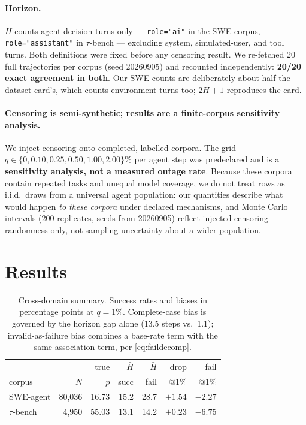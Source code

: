 \documentclass[letterpaper]{article}
\begin{document}
\paragraph{Horizon.} $H$ counts agent decision turns only --- \texttt{role="ai"}
in the SWE corpus, \texttt{role="assistant"} in $\tau$-bench --- excluding
system, simulated-user, and tool turns. Both definitions were fixed before any
censoring result. We re-fetched 20 full trajectories per corpus (seed 20260905)
and recounted independently: \textbf{20/20 exact agreement in both}. Our SWE
counts are deliberately about half the dataset card's, which counts environment
turns too; $2H{+}1$ reproduces the card.

\paragraph{Censoring is semi-synthetic; results are a finite-corpus sensitivity
analysis.} We inject censoring onto completed, labelled corpora. The grid
$q\in\{0,0.10,0.25,0.50,1.00,2.00\}\%$ per agent step was predeclared and is a
\textbf{sensitivity analysis, not a measured outage rate}. Because these corpora
contain repeated tasks and unequal model coverage, we do not treat rows as
i.i.d.\ draws from a universal agent population: our quantities describe what
would happen \emph{to these corpora} under declared mechanisms, and Monte Carlo
intervals (200 replicates, seeds from 20260905) reflect injected censoring
randomness only, not sampling uncertainty about a wider population.

\section{Results}
\label{sec:results}

\begin{table}[t]
\centering
\small
\setlength{\tabcolsep}{4pt}
\begin{tabular}{@{}lrrrrrr@{}}
\toprule
& & true & $\bar H$ & $\bar H$ & drop & fail \\
corpus & $N$ & $p$ & succ & fail & @1\% & @1\% \\
\midrule
SWE-agent & 80{,}036 & 16.73 & 15.2 & 28.7 & $+1.54$ & $-2.27$ \\
$\tau$-bench & 4{,}950 & 55.03 & 13.1 & 14.2 & $+0.23$ & $-6.75$ \\
\bottomrule
\end{tabular}
\caption{Cross-domain summary. Success rates and biases in percentage points at
$q=1\%$. Complete-case bias is governed by the horizon gap alone (13.5 steps
vs.\ 1.1); invalid-as-failure bias combines a base-rate term with the same
association term, per \eqref{eq:faildecomp}.}
\label{tab:cross}
\end{table}
\end{document}
